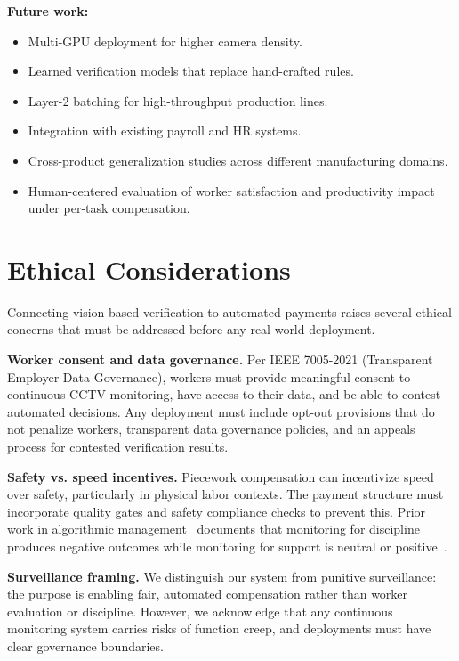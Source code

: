 \documentclass[10pt,twocolumn]{article}
\begin{document}
\textbf{Future work:}
\begin{itemize}[nosep]
\item Multi-GPU deployment for higher camera density.
\item Learned verification models that replace hand-crafted rules.
\item Layer-2 batching for high-throughput production lines.
\item Integration with existing payroll and HR systems.
\item Cross-product generalization studies across different manufacturing domains.
\item Human-centered evaluation of worker satisfaction and productivity impact under per-task compensation.
\end{itemize}

\FloatBarrier

\section{Ethical Considerations}
\label{sec:ethics}

Connecting vision-based verification to automated payments raises several ethical concerns that must be addressed before any real-world deployment. 

\textbf{Worker consent and data governance.} Per IEEE 7005-2021 (Transparent Employer Data Governance), workers must provide meaningful consent to continuous CCTV monitoring, have access to their data, and be able to contest automated decisions. Any deployment must include opt-out provisions that do not penalize workers, transparent data governance policies, and an appeals process for contested verification results.

\textbf{Safety vs. speed incentives.} Piecework compensation can incentivize speed over safety, particularly in physical labor contexts. The payment structure must incorporate quality gates and safety compliance checks to prevent this. Prior work in algorithmic management~\cite{parker2017piecework} documents that monitoring for discipline produces negative outcomes while monitoring for support is neutral or positive~\cite{milanez2025algorithmic}.

\textbf{Surveillance framing.} We distinguish our system from punitive surveillance: the purpose is enabling fair, automated compensation rather than worker evaluation or discipline. However, we acknowledge that any continuous monitoring system carries risks of function creep, and deployments must have clear governance boundaries.
\end{document}
